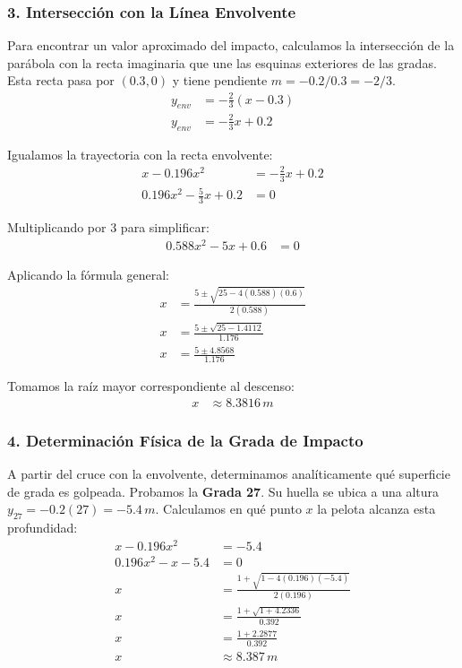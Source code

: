 \documentclass[12pt, a4paper]{article}
\begin{document}
\subsubsection*{3. Intersección con la Línea Envolvente}
Para encontrar un valor aproximado del impacto, calculamos la intersección de la parábola con la recta imaginaria que une las esquinas exteriores de las gradas. Esta recta pasa por $(0.3, 0)$ y tiene pendiente $m = -0.2 / 0.3 = -2/3$.
\begin{align*}
y_{env} &= -\frac{2}{3}(x - 0.3) \\
y_{env} &= -\frac{2}{3}x + 0.2
\end{align*}

Igualamos la trayectoria con la recta envolvente:
\begin{align*}
x - 0.196x^2 &= -\frac{2}{3}x + 0.2 \\
0.196x^2 - \frac{5}{3}x + 0.2 &= 0
\end{align*}

Multiplicando por 3 para simplificar:
\begin{align*}
0.588x^2 - 5x + 0.6 &= 0
\end{align*}

Aplicando la fórmula general:
\begin{align*}
x &= \frac{5 \pm \sqrt{25 - 4(0.588)(0.6)}}{2(0.588)} \\
x &= \frac{5 \pm \sqrt{25 - 1.4112}}{1.176} \\
x &= \frac{5 \pm 4.8568}{1.176}
\end{align*}

Tomamos la raíz mayor correspondiente al descenso:
\begin{align*}
x &\approx 8.3816 \, \si{m}
\end{align*}

\subsubsection*{4. Determinación Física de la Grada de Impacto}
A partir del cruce con la envolvente, determinamos analíticamente qué superficie de grada es golpeada.
Probamos la \textbf{Grada 27}. Su huella se ubica a una altura $y_{27} = -0.2(27) = -5.4 \, \si{m}$.
Calculamos en qué punto $x$ la pelota alcanza esta profundidad:
\begin{align*}
x - 0.196x^2 &= -5.4 \\
0.196x^2 - x - 5.4 &= 0 \\
x &= \frac{1 + \sqrt{1 - 4(0.196)(-5.4)}}{2(0.196)} \\
x &= \frac{1 + \sqrt{1 + 4.2336}}{0.392} \\
x &= \frac{1 + 2.2877}{0.392} \\
x &\approx 8.387 \, \si{m}
\end{align*}
\end{document}
